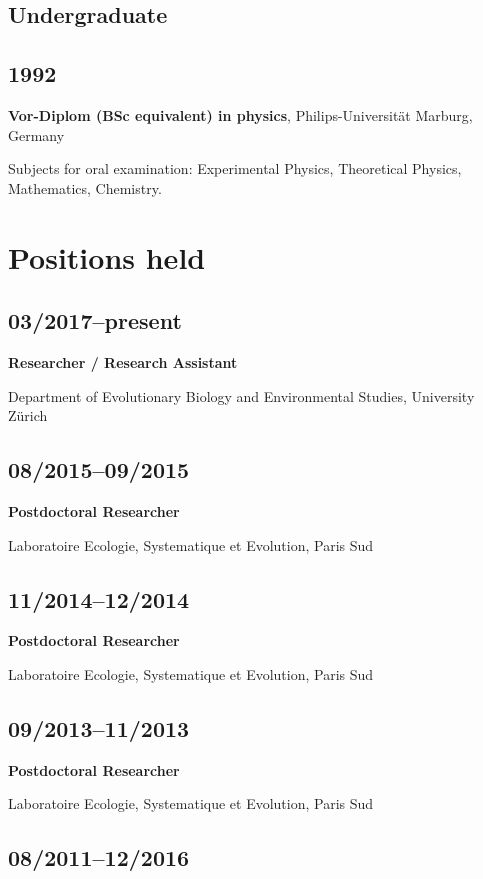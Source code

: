 \documentclass[a4paper]{article}
\begin{document}
\subsection{Undergraduate}

\subsection{1992}

\textbf{Vor-Diplom (BSc equivalent) in physics}, Philips-Universität Marburg, Germany

Subjects for oral examination: Experimental Physics, Theoretical Physics, Mathematics, Chemistry.

\section{Positions held}

\subsection{03/2017--present}

\textbf{Researcher / Research Assistant}

Department of Evolutionary Biology and Environmental Studies, University Zürich

\subsection{08/2015--09/2015}

\textbf{Postdoctoral Researcher} 

Laboratoire Ecologie, Systematique et Evolution, Paris Sud

\subsection{11/2014--12/2014}

\textbf{Postdoctoral Researcher} 

Laboratoire Ecologie, Systematique et Evolution, Paris Sud

\subsection{09/2013--11/2013}

\textbf{Postdoctoral Researcher}

Laboratoire Ecologie, Systematique et Evolution, Paris Sud

\subsection{08/2011--12/2016}
\end{document}
